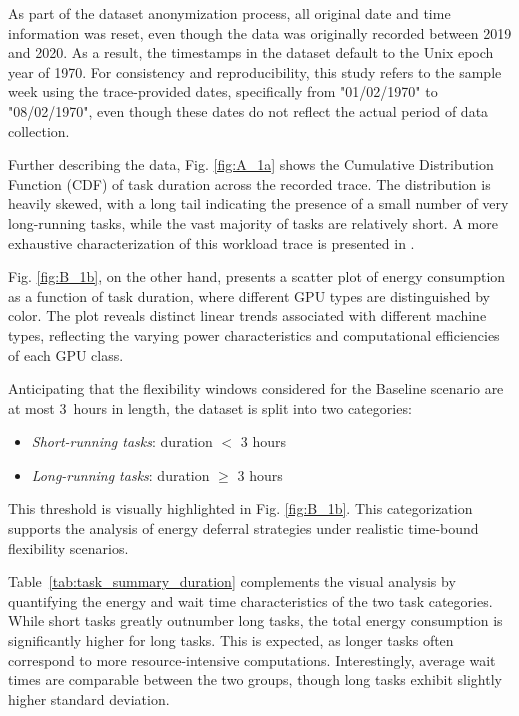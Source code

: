 \documentclass[preprint,12pt]{elsarticle}
\begin{document}
 
As part of the dataset anonymization process, all original date and time information was reset, even though the data was originally recorded between 2019 and 2020. As a result, the timestamps in the dataset default to the Unix epoch year of 1970. For consistency and reproducibility, this study refers to the sample week using the trace-provided dates, specifically from "01/02/1970" to "08/02/1970", even though these dates do not reflect the actual period of data collection.

Further describing the data, Fig. \ref{fig:A_1a} shows the Cumulative Distribution Function (CDF) of task duration across the recorded trace. The distribution is heavily skewed, with a long tail indicating the presence of a small number of very long-running tasks, while the vast majority of tasks are relatively short. A more exhaustive characterization of this workload trace is presented in \cite{Weng2022}.

Fig. \ref{fig:B_1b}, on the other hand, presents a scatter plot of energy consumption as a function of task duration, where different GPU types are distinguished by color. The plot reveals distinct linear trends associated with different machine types, reflecting the varying power characteristics and computational efficiencies of each GPU class.

Anticipating that the flexibility windows considered for the Baseline scenario are at most 3~hours in length, the dataset is split into two categories:
\begin{itemize}
    \item \textit{Short-running tasks}: duration $<$ 3 hours
    \item \textit{Long-running tasks}: duration $\geq$ 3 hours
\end{itemize}

This threshold is visually highlighted in Fig. \ref{fig:B_1b}. This categorization supports the analysis of energy deferral strategies under realistic time-bound flexibility scenarios.

Table~\ref{tab:task_summary_duration} complements the visual analysis by quantifying the energy and wait time characteristics of the two task categories. While short tasks greatly outnumber long tasks, the total energy consumption is significantly higher for long tasks. This is expected, as longer tasks often correspond to more resource-intensive computations. Interestingly, average wait times are comparable between the two groups, though long tasks exhibit slightly higher standard deviation.
\end{document}
